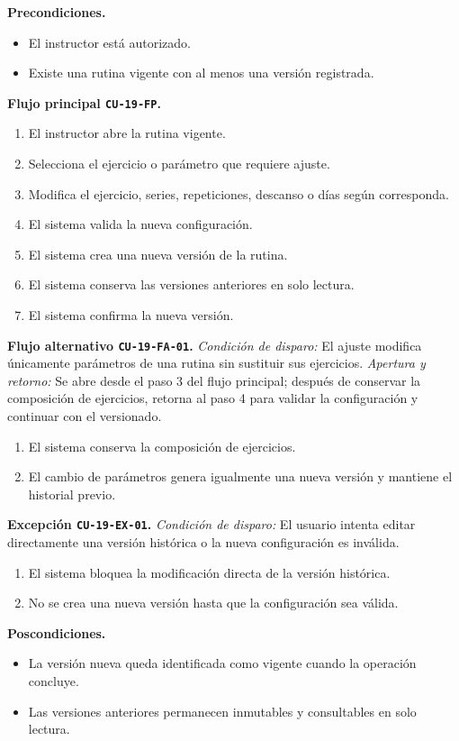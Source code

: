 \documentclass[11pt,a4paper,twoside]{article}
\begin{document}
\textbf{Precondiciones.}
\begin{itemize}
\item El instructor está autorizado.
\item Existe una rutina vigente con al menos una versión registrada.
\end{itemize}

\textbf{Flujo principal \texttt{CU-19-FP}.}
\begin{enumerate}
\item El instructor abre la rutina vigente.
\item Selecciona el ejercicio o parámetro que requiere ajuste.
\item Modifica el ejercicio, series, repeticiones, descanso o días según corresponda.
\item El sistema valida la nueva configuración.
\item El sistema crea una nueva versión de la rutina.
\item El sistema conserva las versiones anteriores en solo lectura.
\item El sistema confirma la nueva versión.
\end{enumerate}

\textbf{Flujo alternativo \texttt{CU-19-FA-01}.} \textit{Condición de disparo:} El ajuste modifica únicamente parámetros de una rutina sin sustituir sus ejercicios. \textit{Apertura y retorno:} Se abre desde el paso 3 del flujo principal; después de conservar la composición de ejercicios, retorna al paso 4 para validar la configuración y continuar con el versionado.
\begin{enumerate}[label=\alph*.]
\item El sistema conserva la composición de ejercicios.
\item El cambio de parámetros genera igualmente una nueva versión y mantiene el historial previo.
\end{enumerate}

\textbf{Excepción \texttt{CU-19-EX-01}.} \textit{Condición de disparo:} El usuario intenta editar directamente una versión histórica o la nueva configuración es inválida.
\begin{enumerate}[label=\alph*.]
\item El sistema bloquea la modificación directa de la versión histórica.
\item No se crea una nueva versión hasta que la configuración sea válida.
\end{enumerate}

\textbf{Poscondiciones.}
\begin{itemize}
\item La versión nueva queda identificada como vigente cuando la operación concluye.
\item Las versiones anteriores permanecen inmutables y consultables en solo lectura.
\end{itemize}
\end{document}
